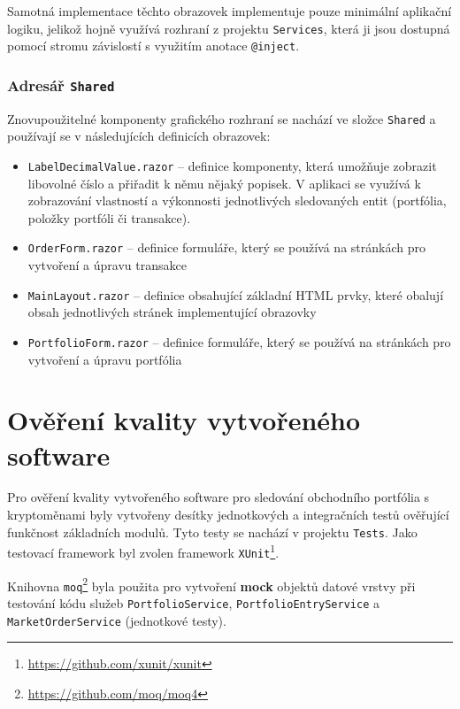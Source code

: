 \documentclass[12pt, a4paper]{article}
\begin{document}
    Samotná implementace těchto obrazovek implementuje pouze minimální aplikační logiku, jelikož hojně využívá rozhraní z projektu
    \texttt{Services}, která ji jsou dostupná pomocí stromu závislostí s využitím anotace \texttt{@inject}.

    \subsubsection{Adresář \texttt{Shared}}
    Znovupoužitelné komponenty grafického rozhraní se nachází ve složce \texttt{Shared} a používají se v následujících definicích obrazovek:

    \begin{itemize}
        \item \texttt{LabelDecimalValue.razor} -- definice komponenty, která umožňuje zobrazit libovolné číslo a přiřadit
        k němu nějaký popisek. V aplikaci se využívá k zobrazování vlastností a výkonnosti jednotlivých sledovaných entit
        (portfólia, položky portfóli či transakce).
        \item \texttt{OrderForm.razor} -- definice formuláře, který se používá na stránkách pro vytvoření a úpravu transakce
        \item \texttt{MainLayout.razor} -- definice obsahující základní HTML prvky, které obalují obsah jednotlivých stránek implementující obrazovky
        \item \texttt{PortfolioForm.razor} -- definice formuláře, který se používá na stránkách pro vytvoření a úpravu portfólia
    \end{itemize}

    \section{Ověření kvality vytvořeného software}

    Pro ověření kvality vytvořeného software pro sledování obchodního portfólia s kryptoměnami byly vytvořeny desítky jednotkových a integračních testů ověřující funkčnost základních modulů. Tyto testy se nachází v projektu \texttt{Tests}. Jako testovací framework byl zvolen framework \texttt{XUnit}\footnote{\url{https://github.com/xunit/xunit}}.

    Knihovna \texttt{moq}\footnote{\url{https://github.com/moq/moq4}} byla použita pro vytvoření \textbf{mock} objektů datové vrstvy při testování kódu služeb \texttt{PortfolioService}, \texttt{PortfolioEntryService} a \texttt{MarketOrderService} (jednotkové testy).
\end{document}
